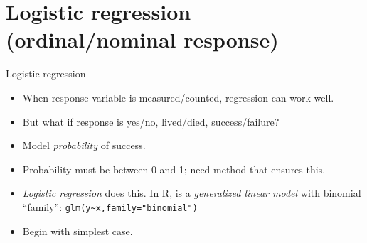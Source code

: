 \section{Logistic regression (ordinal/nominal response)}
\frame{\sectionpage}


\begin{frame}{Logistic regression}

  \begin{itemize}
  \item When response variable is measured/counted, regression can work well.
  \item But what if response is yes/no, lived/died, success/failure?
  \item Model {\em probability} of success.
  \item Probability must be between 0 and 1; need method that ensures this.
  \item {\em Logistic regression} does this. In R, is a
    \emph{generalized linear model} with binomial ``family'': 
\texttt{glm(y\textasciitilde x,family="binomial")}
    
  \item Begin with simplest case.
    
  \end{itemize}
  
\end{frame}

